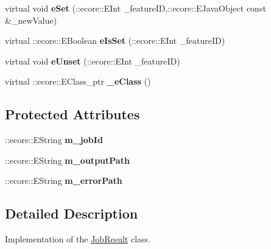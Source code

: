 \begin{DoxyCompactItemize}
\item 
\hypertarget{classTMS__Data_1_1JobResult_ac19a3b4493cc9780f6cb7727881cbfa8}{
virtual void {\bfseries eSet} (::ecore::EInt \_\-featureID,::ecore::EJavaObject const \&\_\-newValue)}
\label{classTMS__Data_1_1JobResult_ac19a3b4493cc9780f6cb7727881cbfa8}

\item 
\hypertarget{classTMS__Data_1_1JobResult_a9f44b65045a669ef1f3f828ce807d287}{
virtual ::ecore::EBoolean {\bfseries eIsSet} (::ecore::EInt \_\-featureID)}
\label{classTMS__Data_1_1JobResult_a9f44b65045a669ef1f3f828ce807d287}

\item 
\hypertarget{classTMS__Data_1_1JobResult_afbab3663dc793c31e3cb73980f4ba3f6}{
virtual void {\bfseries eUnset} (::ecore::EInt \_\-featureID)}
\label{classTMS__Data_1_1JobResult_afbab3663dc793c31e3cb73980f4ba3f6}

\item 
\hypertarget{classTMS__Data_1_1JobResult_aaea567b5ee09442b6e8867050bb5f8ad}{
virtual ::ecore::EClass\_\-ptr {\bfseries \_\-eClass} ()}
\label{classTMS__Data_1_1JobResult_aaea567b5ee09442b6e8867050bb5f8ad}

\end{DoxyCompactItemize}
\subsection*{Protected Attributes}
\begin{DoxyCompactItemize}
\item 
\hypertarget{classTMS__Data_1_1JobResult_a5212dc0ce390fea92ef9c15b26405b0f}{
::ecore::EString {\bfseries m\_\-jobId}}
\label{classTMS__Data_1_1JobResult_a5212dc0ce390fea92ef9c15b26405b0f}

\item 
\hypertarget{classTMS__Data_1_1JobResult_aef7257c153222cf834bbbf0f10758156}{
::ecore::EString {\bfseries m\_\-outputPath}}
\label{classTMS__Data_1_1JobResult_aef7257c153222cf834bbbf0f10758156}

\item 
\hypertarget{classTMS__Data_1_1JobResult_a48aad2251ff37b5cf4ea1ecf18af693c}{
::ecore::EString {\bfseries m\_\-errorPath}}
\label{classTMS__Data_1_1JobResult_a48aad2251ff37b5cf4ea1ecf18af693c}

\end{DoxyCompactItemize}


\subsection{Detailed Description}
Implementation of the \hyperlink{classTMS__Data_1_1JobResult}{JobResult} class. 


